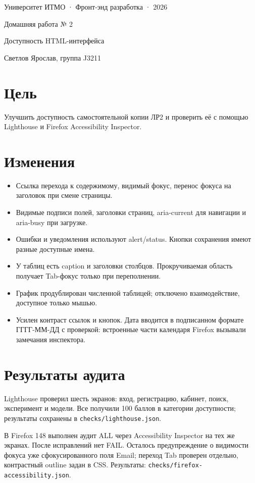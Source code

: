 \documentclass[11pt,a4paper]{article}
\begin{document}
\begin{center}
{\small Университет ИТМО · Фронт-энд разработка · 2026}\par
{\LARGE Домашняя работа № 2}\par
{\large Доступность HTML-интерфейса}\par
Светлов Ярослав, группа J3211
\end{center}
\section*{Цель}
Улучшить доступность самостоятельной копии ЛР2 и проверить её с помощью Lighthouse и Firefox Accessibility Inspector.
\section*{Изменения}
\begin{itemize}
\item Ссылка перехода к содержимому, видимый фокус, перенос фокуса на заголовок при смене страницы.
\item Видимые подписи полей, заголовки страниц, aria-current для навигации и aria-busy при загрузке.
\item Ошибки и уведомления используют alert/status. Кнопки сохранения имеют разные доступные имена.
\item У таблиц есть caption и заголовки столбцов. Прокручиваемая область получает Tab-фокус только при переполнении.
\item График продублирован численной таблицей; отключено взаимодействие, доступное только мышью.
\item Усилен контраст ссылок и кнопок. Дата вводится в подписанном формате ГГГГ-ММ-ДД с проверкой: встроенные части календаря Firefox вызывали замечания инспектора.
\end{itemize}

\section*{Результаты аудита}
Lighthouse проверил шесть экранов: вход, регистрацию, кабинет, поиск, эксперимент и модели. Все получили 100 баллов в категории доступности; результаты сохранены в \texttt{checks/lighthouse.json}.

В Firefox 148 выполнен аудит ALL через Accessibility Inspector на тех же экранах. После исправлений нет FAIL. Осталось предупреждение о видимости фокуса уже сфокусированного поля Email; переход Tab проверен отдельно, контрастный outline задан в CSS. Результаты: \texttt{checks/firefox-accessibility.json}.
\end{document}
